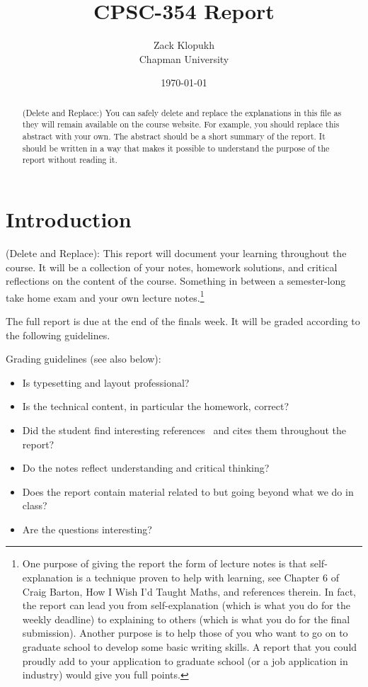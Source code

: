 \documentclass{article}
\title{CPSC-354 Report}
\author{Zack Klopukh \\ Chapman University}
\date{\today}
\theoremstyle{theorem}
\theoremstyle{definition}
\theoremstyle{remark}
\begin{document}
\maketitle

\begin{abstract}
(Delete and Replace:) You can safely delete and replace the explanations in this file as they will remain available on the course website. For example, you should replace this abstract with your own. The abstract should be a short summary of the report. It should be written in a way that makes it possible to understand the purpose of the report without reading it.  
\end{abstract}

\setcounter{tocdepth}{3}
\tableofcontents

\section{Introduction}\label{intro}

(Delete and Replace): This report will document your learning throughout the course. It will be a collection of your notes, homework solutions, and critical reflections on the content of the course. Something in between a semester-long take home exam and your own lecture notes.\footnote{One purpose of giving the report the form of lecture notes is that self-explanation is a technique proven to help with learning, see Chapter 6 of Craig Barton, How I Wish I'd Taught Maths, and references therein. In fact, the report can lead you from self-explanation (which is what you do for the weekly deadline) to explaining to others (which is what you do for the final submission). Another purpose is to help those of you who want to go on to graduate school to develop some basic writing skills. A report that you could proudly add to your application to graduate school (or a job application in industry) would give you full points.}



The full report is due at the end of the finals week. It will be graded according to the following guidelines.

Grading  guidelines (see also below):
\begin{itemize}
\item Is typesetting and layout professional? 
\item Is the technical content, in particular the homework, correct?
\item Did the student find interesting references~\cite{bla} and cites them throughout the report?
\item Do the notes reflect understanding and critical thinking?
\item Does the report contain material related to but going beyond what we do in class?
\item Are the questions interesting?
\end{itemize}
\end{document}
